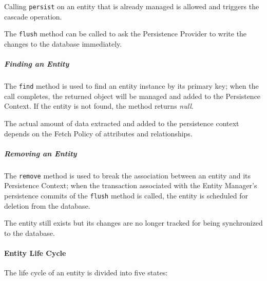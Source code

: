 \documentclass[english]{article}
\begin{document}
Calling \texttt{persist} on an entity that is already managed is allowed and triggers the cascade operation.

The \texttt{flush} method can be called to ask the Persistence Provider to write the changes to the database immediately.

\subparagraph*{Finding an Entity}
The \texttt{find} method is used to find an entity instance by its primary key;
when the call completes, the returned object will be managed and added to the Persistence Context.
If the entity is not found, the method returns \textit{null}.

The actual amount of data extracted and added to the persistence context depends on the Fetch Policy of attributes and relationships.

\subparagraph*{Removing an Entity}
The \texttt{remove} method is used to break the association between an entity and its Persistence Context;
when the transaction associated with the Entity Manager's persistence commits of the \texttt{flush} method is called, the entity is scheduled for deletion from the database.

The entity still exists but its changes are no longer tracked for being synchronized to the database.

\paragraph{Entity Life Cycle}

The life cycle of an entity is divided into five states:
\end{document}
